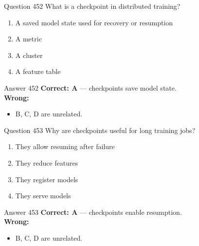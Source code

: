 \documentclass[aspectratio=169,11pt]{beamer}
\begin{document}
	\begin{frame}{Question 452}
		What is a checkpoint in distributed training?
		\begin{enumerate}[label=\Alph*.]
			\item A saved model state used for recovery or resumption
			\item A metric
			\item A cluster
			\item A feature table
		\end{enumerate}
	\end{frame}
	\begin{frame}{Answer 452}
		\textbf{Correct: A} --- checkpoints save model state.\\
		\vspace{0.5em}
		\textbf{Wrong:}
		\begin{itemize}
			\item B, C, D are unrelated.
		\end{itemize}
	\end{frame}
	
	\begin{frame}{Question 453}
		Why are checkpoints useful for long training jobs?
		\begin{enumerate}[label=\Alph*.]
			\item They allow resuming after failure
			\item They reduce features
			\item They register models
			\item They serve models
		\end{enumerate}
	\end{frame}
	\begin{frame}{Answer 453}
		\textbf{Correct: A} --- checkpoints enable resumption.\\
		\vspace{0.5em}
		\textbf{Wrong:}
		\begin{itemize}
			\item B, C, D are unrelated.
		\end{itemize}
	\end{frame}
	
\end{document}
